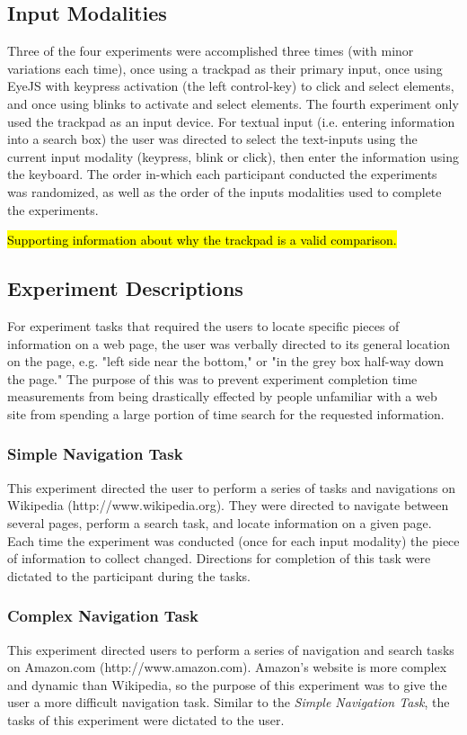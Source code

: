 \documentclass{sigchi}
\begin{document}
\subsection{Input Modalities}
Three of the four experiments were accomplished three times (with minor variations each time), once using a trackpad as their primary input, once using EyeJS with keypress activation (the left control-key) to click and select elements, and once using blinks to activate and select elements. The fourth experiment only used the trackpad as an input device. For textual input (i.e. entering information into a search box) the user was directed to select the text-inputs using the current input modality (keypress, blink or click), then enter the information using the keyboard. The order in-which each participant conducted the experiments was randomized, as well as the order of the inputs modalities used to complete the experiments. 

\hl{Supporting information about why the trackpad is a valid comparison.}


\subsection{Experiment Descriptions}
For experiment tasks that required the users to locate specific pieces of information on a web page, the user was verbally directed to its general location on the page, e.g. "left side near the bottom," or "in the grey box half-way down the page." The purpose of this was to prevent experiment completion time measurements from being drastically effected by people unfamiliar with a web site from spending a large portion of time search for the requested information.

\subsubsection{Simple Navigation Task}
This experiment directed the user to perform a series of tasks and navigations on Wikipedia (http://www.wikipedia.org). They were directed to navigate between several pages, perform a search task, and locate information on a given page. Each time the experiment was conducted (once for each input modality) the piece of information to collect changed. Directions for completion of this task were dictated to the participant during the tasks.

\subsubsection{Complex Navigation Task}
This experiment directed users to perform a series of navigation and search tasks on Amazon.com (http://www.amazon.com). Amazon's website is more complex and dynamic than Wikipedia, so the purpose of this experiment was to give the user a more difficult navigation task. Similar to the \textit{Simple Navigation Task}, the tasks of this experiment were dictated to the user.
\end{document}
